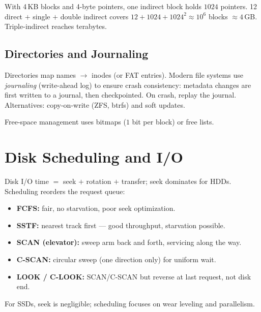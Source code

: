 \begin{example}
With 4\,KB blocks and 4-byte pointers, one indirect block holds $1024$ pointers.
12 direct $+$ single $+$ double indirect covers $12 + 1024 + 1024^2 \approx 10^6$
blocks $\approx 4$\,GB. Triple-indirect reaches terabytes.
\end{example}

\subsection{Directories and Journaling}
Directories map names $\to$ inodes (or FAT entries). Modern file systems use
\emph{journaling} (write-ahead log) to ensure crash consistency: metadata
changes are first written to a journal, then checkpointed. On crash, replay the
journal. Alternatives: copy-on-write (ZFS, btrfs) and soft updates.

Free-space management uses bitmaps ($1$ bit per block) or free lists.

\section{Disk Scheduling and I/O}
\label{sec:disk-io}

Disk I/O time $=$ seek $+$ rotation $+$ transfer; seek dominates for HDDs.
Scheduling reorders the request queue:

\begin{itemize}
  \item \textbf{FCFS:} fair, no starvation, poor seek optimization.
  \item \textbf{SSTF:} nearest track first --- good throughput, starvation possible.
  \item \textbf{SCAN (elevator):} sweep arm back and forth, servicing along the way.
  \item \textbf{C-SCAN:} circular sweep (one direction only) for uniform wait.
  \item \textbf{LOOK / C-LOOK:} SCAN/C-SCAN but reverse at last request, not disk end.
\end{itemize}

For SSDs, seek is negligible; scheduling focuses on wear leveling and parallelism.

